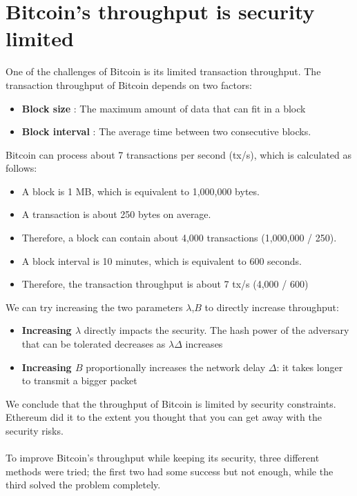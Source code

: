 \section{Bitcoin’s throughput is security limited}
One of the challenges of Bitcoin is its limited transaction throughput. The transaction throughput of Bitcoin depends on two factors:
\begin{itemize}
	\item \textbf{Block size} :  The maximum amount of data that can fit in a block
	\item \textbf{Block interval} : The average time between two consecutive blocks.
\end{itemize} 
Bitcoin can process about 7 transactions per second (tx/s), which is calculated as follows:
\begin{itemize}
	\item A block is 1 MB, which is equivalent to 1,000,000 bytes.
	\item A transaction is about 250 bytes on average.
	\item Therefore, a block can contain about 4,000 transactions (1,000,000 / 250).
	\item A block interval is 10 minutes, which is equivalent to 600 seconds.
	\item Therefore, the transaction throughput is about 7 tx/s (4,000 / 600)
\end{itemize}
We can try increasing the two parameters $\lambda$,$B$ to directly increase throughput:
\begin{itemize}
	\item \textbf{Increasing $\lambda$} directly impacts the security. The hash power of the adversary that can be tolerated
	decreases as $\lambda\Delta$ increases
	\item \textbf{Increasing $B$} proportionally increases the network delay $\Delta$: it takes longer to transmit
	a bigger packet
\end{itemize}
We conclude that the throughput of Bitcoin is limited by security constraints.
Ethereum did it to the extent you thought that you can get away with the security risks.\\\\
To improve Bitcoin’s throughput while keeping its security, three different methods were tried; the first two had some success but not enough, while the third solved the problem completely.
